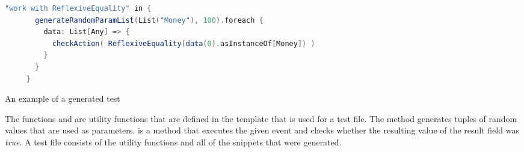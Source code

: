 \FloatBarrier
\begin{sourcecode}[!ht]
\begin{lstlisting}[language=Scala]
    "work with ReflexiveEquality" in {
       generateRandomParamList(List("Money"), 100).foreach {
         data: List[Any] => {
           checkAction( ReflexiveEquality(data(0).asInstanceOf[Money]) )
         }
       }
     }
\end{lstlisting}
\caption{An example of a generated test}
\label{lst:ch3_generated_test_example}
\end{sourcecode}
\FloatBarrier
The functions  and  are utility functions that are defined in the template that is used for a test file. The  method generates tuples of random values that are used as parameters.  is a method that executes the given event and checks whether the resulting value of the result field was \textit{true}. A test file consists of the utility functions and all of the snippets that were generated.

